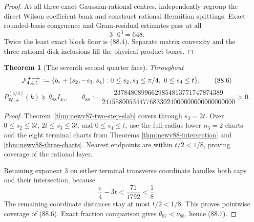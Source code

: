 \documentclass[11pt,oneside]{article}
\newtheorem{theorem}{Theorem}[section]
\theoremstyle{definition}
\theoremstyle{remark}
\begin{document}
\begin{proof}
At all three exact Gaussian-rational centres, independently regroup
the direct Wilson coefficient bank and construct rational Hermitian
splittings.  Exact rounded-basis congruence and Gram-residual
estimates pass at all
\[
 3\cdot6^3=648.                                       \tag{88.5}
\]
Twice the least exact block floor is (88.4).  Separate matrix
convexity and the three rational disk inclusions fill the physical
product boxes.
\end{proof}

\begin{theorem}[The seventh second quarter face]
\label{thm:newv88-second-face}
Throughout
\[
 {\cal F}^{+-+}_{4,4,1}:=
 \{b_\circ+(s_2,-s_3,s_4):
 0\leq s_2,s_3\leq\pi/4,\ 0\leq s_4\leq t\},          \tag{88.6}
\]
\[
 P_{\mathrm W,+}^{(4/3)}(k)
 \succeq\theta_{88}I_{45},\qquad
 \theta_{88}:=
 \frac{23784808996629854813771747874389}
 {241558005344776833024000000000000000000}>0.         \tag{88.7}
\]
\end{theorem}

\begin{proof}
Theorem~\ref{thm:newv87-two-step-slab} covers through \(s_3=2t\).
Over \(0\leq s_2\leq3t\), \(2t\leq s_3\leq3t\), and
\(0\leq s_4\leq t\), use the full-radius lower \(n_3=2\) charts and
the eight terminal charts from Theorems
\ref{thm:newv88-intersection} and
\ref{thm:newv88-three-charts}.  Nearest endpoints are within
\(t/2<1/8\), proving coverage of the rational layer.

Retaining exponent \(3\) on either terminal transverse coordinate
handles both caps and their intersection, because
\[
 \frac{\pi}{4}-3t<\frac{71}{1792}<\frac18.            \tag{88.8}
\]
The remaining coordinate distances stay at most \(t/2<1/8\).
This proves pointwise coverage of (88.6).  Exact fraction comparison
gives \(\theta_{87}<\nu_{88}\), hence (88.7).
\end{proof}
\end{document}
